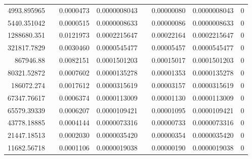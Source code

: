 \documentclass[
journal=jacsat, %
manuscript=article]{achemso}
\begin{document}
\begin{table}[htbp]
{\begin{tabular}{rrrrrrrr}
    4993.895965 &       & 0.0000473 & 0.0000008043 &       & 0.00000080 & 0.0000008043 & 0 \\
    5440.351042 &       & 0.0000515 & 0.0000008633 &       & 0.00000086 & 0.0000008633 & 0 \\
    1288680.351 &       & 0.0121973 & 0.0002215647 &       & 0.00022164 & 0.0002215647 & 0 \\
    321817.7829 &       & 0.0030460 & 0.0000545477 &       & 0.00005457 & 0.0000545477 & 0 \\
    867946.88 &       & 0.0082151 & 0.0001501203 &       & 0.00015017 & 0.0001501203 & 0 \\
    80321.52872 &       & 0.0007602 & 0.0000135278 &       & 0.00001353 & 0.0000135278 & 0 \\
    186072.274 &       & 0.0017612 & 0.0000315619 &       & 0.00003157 & 0.0000315619 & 0 \\
    67347.76617 &       & 0.0006374 & 0.0000113009 &       & 0.00001130 & 0.0000113009 & 0 \\
    65579.39339 &       & 0.0006207 & 0.0000109421 &       & 0.00001095 & 0.0000109421 & 0 \\
    43778.18885 &       & 0.0004144 & 0.0000073316 &       & 0.00000733 & 0.0000073316 & 0 \\
    21447.18513 &       & 0.0002030 & 0.0000035420 &       & 0.00000354 & 0.0000035420 & 0 \\
    11682.56718 &       & 0.0001106 & 0.0000019038 &       & 0.00000190 & 0.0000019038 & 0 \\
    \bottomrule
    \end{tabular}%
    }
  \label{tab:addlabel}%
\end{table}%
\end{document}
